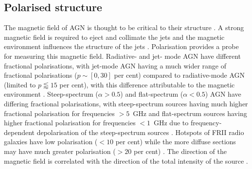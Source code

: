     \subsection{Polarised structure}
    \label{sec:polarised-structure-of-agn}

        The magnetic field of AGN is thought to be critical to their structure \citep{sikora_magnetic_2013}. A strong magnetic field is required to eject and collimate the jets \citep{lovelace_dynamo_1976} and the magnetic environment influences the structure of the jets \citep{osullivan_magnetic_2015}. Polarisation provides a probe for measuring this magnetic field. Radiative- and jet- mode AGN have different fractional polarisations, with jet-mode AGN having a much wider range of fractional polarisations ($p \sim [0, 30]$ per cent) compared to radiative-mode AGN (limited to $p \lessapprox 15$ per cent), with this difference attributable to the magnetic environment \citep{osullivan_magnetic_2015}. Steep-spectrum ($\alpha > 0.5$) and flat-spectrum ($\alpha < 0.5$) AGN have differing fractional polarisations, with steep-spectrum sources having much higher fractional polarisation for frequencies $> 5$~GHz and flat-spectrum sources having higher fractional polarisation for frequencies $< 1$~GHz due to frequency-dependent depolarisation of the steep-spectrum sources \citep{saikia_polarization_1988}. Hotspots of FRII radio galaxies have low polarisation ($<10$ per cent) while the more diffuse sections may have much greater polarisation ($>20$ per cent) \citep{saikia_polarization_1988}. The direction of the magnetic field is correlated with the direction of the total intensity of the source \citep{saikia_polarization_1988}. \todo{}






